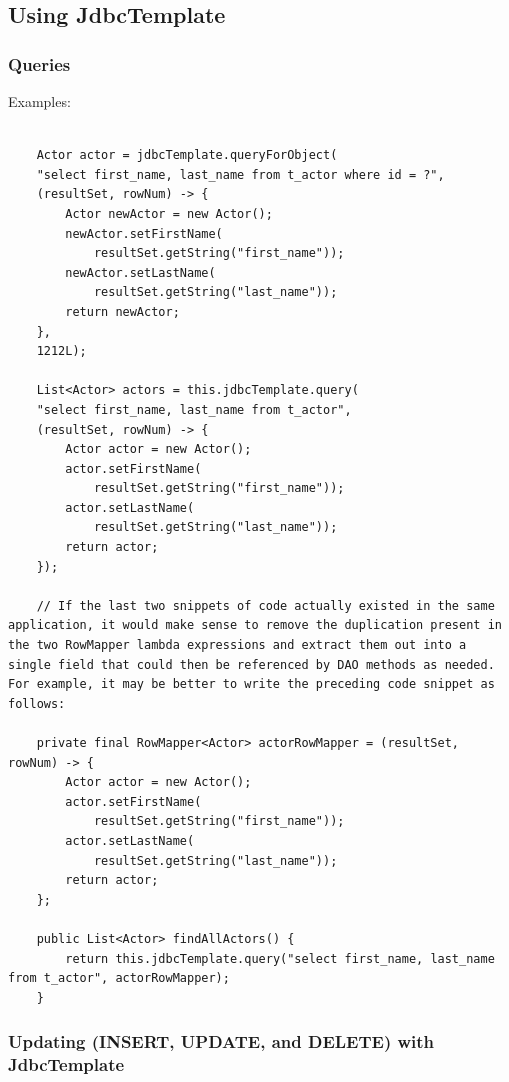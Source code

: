 \documentclass{scrartcl}
\begin{document}
\subsection{Using JdbcTemplate}

\subsubsection{Queries}

Examples:

\begin{lstlisting}

    Actor actor = jdbcTemplate.queryForObject(
    "select first_name, last_name from t_actor where id = ?",
    (resultSet, rowNum) -> {
        Actor newActor = new Actor();
        newActor.setFirstName(
            resultSet.getString("first_name"));
        newActor.setLastName(
            resultSet.getString("last_name"));
        return newActor;
    },
    1212L);

    List<Actor> actors = this.jdbcTemplate.query(
    "select first_name, last_name from t_actor",
    (resultSet, rowNum) -> {
        Actor actor = new Actor();
        actor.setFirstName(
            resultSet.getString("first_name"));
        actor.setLastName(
            resultSet.getString("last_name"));
        return actor;
    });

    // If the last two snippets of code actually existed in the same application, it would make sense to remove the duplication present in the two RowMapper lambda expressions and extract them out into a single field that could then be referenced by DAO methods as needed. For example, it may be better to write the preceding code snippet as follows:

    private final RowMapper<Actor> actorRowMapper = (resultSet, rowNum) -> {
        Actor actor = new Actor();
        actor.setFirstName(
            resultSet.getString("first_name"));
        actor.setLastName(
            resultSet.getString("last_name"));
        return actor;
    };

    public List<Actor> findAllActors() {
        return this.jdbcTemplate.query("select first_name, last_name from t_actor", actorRowMapper);
    }
\end{lstlisting}

\subsubsection{Updating (INSERT, UPDATE, and DELETE) with JdbcTemplate}
\end{document}
